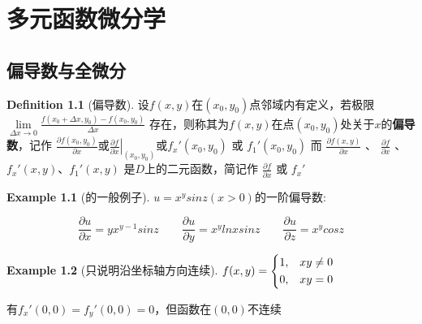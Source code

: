 \documentclass[oneside]{book}
\theoremstyle{definition}
\theoremstyle{definition}
\theoremstyle{cth}
\newtheorem{definition}{Definition}[section]
\theoremstyle{cnthm}
\newtheorem{example}{Example}[section]
\begin{document}
		
		
		
		
		
			
	
	\chapter{多元函数微分学}
	\section{偏导数与全微分}
		
		\begin{definition}[偏导数]
			
			设$f(x,y)$在$(x_0,y_0)$点邻域内有定义，若极限
			$\displaystyle \lim\limits_{\Delta x \to 0} \frac{f(x_0+\Delta x,y_0)-f(x_0,y_0)}{\Delta x}$
			存在，则称其为$f(x,y)$在点$(x_0,y_0)$处关于$x$的\textbf{偏导数}，记作
			$\displaystyle \frac{\partial f(x_0,y_0)}{\partial x}\text{或}\left.\frac{\partial f}{\partial x}\right |_{(x_0,y_0)}\text{或}f_x'(x_0,y_0)$
			或 
			$f_1'(x_0,y_0)$
			而
			$\displaystyle \frac{\partial f(x,y)}{\partial x}$
			 、
			$\displaystyle \frac{\partial f}{\partial x}$
			 、
			$\displaystyle f_x'(x,y)\text{、} f_1'(x,y)$
			是$D$上的二元函数，简记作
			$\displaystyle \frac{\partial f}{\partial x}$
			或
			$\displaystyle f_x'$
			
		\end{definition}
			
			\begin{example}[的一般例子]
				
				$u=x^ysinz(x>0)$的一阶偏导数:
				
				\[\frac{\partial u}{\partial x}=yx^{y-1}sinz \qquad \frac{\partial u}{\partial y}=x^ylnxsinz \qquad \frac{\partial u}{\partial z}=x^ycosz\]
				
			\end{example}
			
			\begin{example}[只说明沿坐标轴方向连续]
				
				$f(x,y)=\begin{dcases}
						1,  &xy\neq 0\\
						0,  &xy=0
					\end{dcases}$
				
				有$f_x'(0,0)=f_y'(0,0)=0$，但函数在$(0,0)$不连续
				
			\end{example}
		
		
	
	
	
	
	
	
	
	
	
	
	
	
	
	
	
	
	
	
	
	
	
	
	
	
	
	
	
	
	
	
	
	
	
	
	
\end{document}
